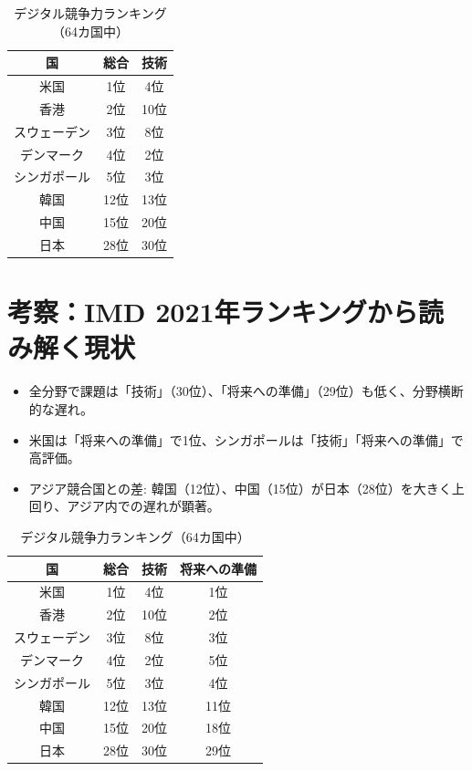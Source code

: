 \documentclass[a4paper,11pt,dvipdfmx]{ujarticle}
\begin{document}
\begin{table}[htbp]
    \centering
    \caption{デジタル競争力ランキング（64カ国中）}
    \label{tbl:デジタル競争}

    \begin{tabular}{|c|c|c|}
        \hline
        国 & 総合 & 技術\\
        \hline
        米国 & 1位 & 4位\\
        \hline
        香港 & 2位 & 10位\\
        \hline
        スウェーデン & 3位 & 8位\\
        \hline
        デンマーク & 4位 & 2位\\
        \hline
        シンガポール & 5位 & 3位\\
        \hline
        \hline
        韓国 & 12位 & 13位\\
        \hline
        中国 & 15位 & 20位\\
        \hline
        \hline
        日本 & 28位 & 30位\\
        \hline
    \end{tabular}
\end{table}

\section{考察：IMD 2021年ランキングから読み解く現状}

\begin{itemize}
    \item 全分野で課題は「技術」（30位）、「将来への準備」（29位）も低く、分野横断的な遅れ。
    \item 米国は「将来への準備」で1位、シンガポールは「技術」「将来への準備」で高評価。
    \item アジア競合国との差: 韓国（12位）、中国（15位）が日本（28位）を大きく上回り、アジア内での遅れが顕著。
\end{itemize}

\begin{table}[htbp]
    \centering
    \caption{デジタル競争力ランキング（64カ国中）}

    \begin{tabular}{|c|c|c|c|}
        \hline
        国 & 総合 & 技術 & 将来への準備 \\
        \hline
        米国 & 1位 & 4位 & 1位 \\
        \hline
        香港 & 2位 & 10位 & 2位 \\
        \hline
        スウェーデン & 3位 & 8位 & 3位\\
        \hline
        デンマーク & 4位 & 2位 & 5位 \\
        \hline
        シンガポール & 5位 & 3位 & 4位\\
        \hline
        韓国 & 12位 & 13位 & 11位 \\
        \hline
        中国 & 15位 & 20位 & 18位 \\
        \hline
        日本 & 28位 & 30位 & 29位 \\
        \hline
    \end{tabular}
\end{table}


\end{document}
